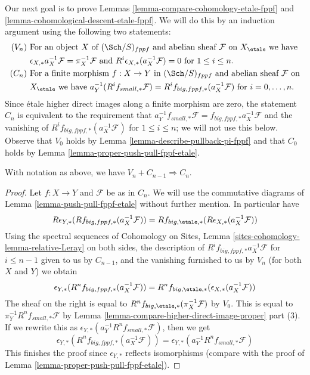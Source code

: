 \noindent
Our next goal is to prove Lemmas \ref{lemma-compare-cohomology-etale-fppf} and
\ref{lemma-cohomological-descent-etale-fppf}. We will do this by an induction
argument using the following two statements:
\begin{align*}
(V_n) &
\text{ For an object }X
\text{ of }(\Sch/S)_{fppf}
\text{ and abelian sheaf }\mathcal{F}
\text{ on }X_\etale
\text{ we have}\\
&
\text{ }\epsilon_{X, *}a_X^{-1}\mathcal{F} = \pi_X^{-1}\mathcal{F}
\text{ and }R^i\epsilon_{X, *}(a_X^{-1}\mathcal{F}) = 0
\text{ for }1 \leq i \leq n. \\
(C_n) &
\text{ For a finite morphism }f : X \to Y
\text{ in }(\Sch/S)_{fppf}
\text{ and abelian sheaf }\mathcal{F}
\text{ on}\\
&
\text{ }X_\etale
\text{ we have }a_Y^{-1}(R^if_{small, *}\mathcal{F}) =
R^if_{big, fppf, *}(a_X^{-1}\mathcal{F})
\text{ for }i = 0, \ldots, n.
\end{align*}
Since \'etale higher direct images along a finite morphism are zero, the
statement $C_n$ is equivalent to the requirement that
$a_Y^{-1}f_{small, *}\mathcal{F} = f_{big, fppf, *}a_X^{-1}\mathcal{F}$
and the vanishing of $R^if_{big, fppf, *}(a_X^{-1}\mathcal{F})$ for
$1 \leq i \leq n$; we will not use this below.
Observe that $V_0$ holds by Lemma \ref{lemma-describe-pullback-pi-fppf}
and that $C_0$ holds by
Lemma \ref{lemma-proper-push-pull-fppf-etale}.

\begin{lemma}
\label{lemma-V-implies-C-etale-fppf}
With notation as above, we have $V_n + C_{n - 1} \Rightarrow C_n$.
\end{lemma}

\begin{proof}
Let $f : X \to Y$ and $\mathcal{F}$ be as in $C_n$.
We will use the commutative diagrams of
Lemma \ref{lemma-push-pull-fppf-etale}
without further mention. In particular have
$$
R\epsilon_{Y, *}(Rf_{big, fppf, *}(a_X^{-1}\mathcal{F})) =
Rf_{big, \etale, *}(R\epsilon_{X, *}(a_X^{-1}\mathcal{F}))
$$
Using the spectral sequences of
Cohomology on Sites, Lemma \ref{sites-cohomology-lemma-relative-Leray}
on both sides, the description of $R^if_{big, fppf, *}a_X^{-1}\mathcal{F}$
for $i \leq n - 1$ given to us by $C_{n - 1}$, and
the vanishing furnished to us by $V_n$
(for both $X$ and $Y$) we obtain 
$$
\epsilon_{Y, *}(R^nf_{big, fppf, *}(a_X^{-1}\mathcal{F})) =
R^nf_{big, \etale, *}(\epsilon_{X, *}(a_X^{-1}\mathcal{F}))
$$
The sheaf on the right is equal to
$R^nf_{big, \etale, *}(\pi_X^{-1}\mathcal{F})$ by $V_0$.
This is equal to $\pi_Y^{-1} R^nf_{small, *}\mathcal{F}$
by Lemma \ref{lemma-compare-higher-direct-image-proper} part (3).
If we rewrite this as
$\epsilon_{Y, *}(a_Y^{-1}R^nf_{small, *}\mathcal{F})$, then we get
$$
\epsilon_{Y, *}(R^nf_{big, fppf, *}(a_X^{-1}\mathcal{F})) =
\epsilon_{Y, *}(a_Y^{-1}R^nf_{small, *}\mathcal{F})
$$
This finishes the proof since $\epsilon_{Y, *}$ reflects
isomorphisms (compare with the
proof of Lemma \ref{lemma-proper-push-pull-fppf-etale}).
\end{proof}

